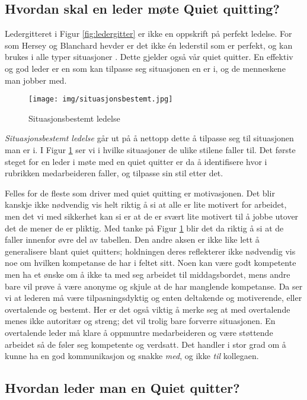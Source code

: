 \documentclass[a4paper, 12pt]{article}  %
\begin{document}
\subsection{Hvordan skal en leder møte Quiet quitting?}

Ledergitteret i Figur \ref{fig:ledergitter} er ikke en oppskrift på perfekt ledelse. 
For som Hersey og Blanchard hevder er det ikke én lederstil som er perfekt, og kan brukes i alle typer situasjoner \parencite{ledelse}. 
Dette gjelder også vår quiet quitter. 
En effektiv og god leder er en som kan tilpasse seg situasjonen en er i, og de menneskene man jobber med. 

\begin{figure}[H]
  \centering
  \texttt{[image: img/situasjonsbestemt.jpg]}
  \caption{Situasjonsbestemt ledelse \parencite{ledelse}}
  \label{fig:situasjon}
\end{figure}

\emph{Situasjonsbestemt ledelse} går ut på å nettopp dette å tilpasse seg til situasjonen man er i. 
I Figur \ref{fig:situasjon} ser vi i hvilke situasjoner de ulike stilene faller til. 
Det første steget for en leder i møte med en quiet quitter er da å identifisere hvor i rubrikken medarbeideren faller, og tilpasse sin stil etter det. 

Felles for de fleste som driver med quiet quitting er motivasjonen. 
Det blir kanskje ikke nødvendig vis helt riktig å si at alle er lite motivert for arbeidet, men det vi med sikkerhet kan si er at de er svært lite motivert til å jobbe utover det de mener de er pliktig.
Med tanke på Figur \ref{fig:situasjon} blir det da riktig å si at de faller innenfor øvre del av tabellen.
Den andre aksen er ikke like lett å generalisere blant quiet quitters; holdningen deres reflekterer ikke nødvendig vis noe om hvilken kompetanse de har i feltet sitt. 
Noen kan være godt kompetente men ha et ønske om å ikke ta med seg arbeidet til middagsbordet, mens andre bare vil prøve å være anonyme og skjule at de har manglende kompetanse.
Da ser vi at lederen må være tilpasningsdyktig og enten deltakende og motiverende, eller overtalende og bestemt. 
Her er det også viktig å merke seg at med overtalende menes ikke autoritær og streng; det vil trolig bare forverre situasjonen.
En overtalende leder må klare å oppmuntre medarbeideren og være støttende arbeidet så de føler seg kompetente og verdsatt.
Det handler i stor grad om å kunne ha en god kommunikasjon og snakke \emph{med}, og ikke \emph{til} kollegaen.


\subsection{Hvordan leder man en Quiet quitter?}
\end{document}
